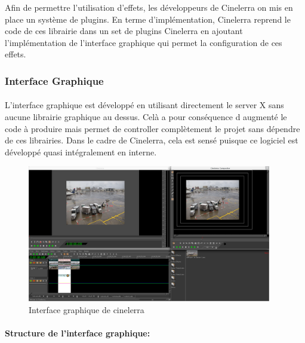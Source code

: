 Afin de permettre l'utilisation d'effets, les développeurs de Cinelerra
on mis en place un système de plugins. En terme d'implémentation,
Cinelerra reprend le code de ces librairie dans un set de plugins
Cinelerra en ajoutant l'implémentation de l'interface graphique qui
permet la configuration de ces effets.

\subsubsection{Interface Graphique}

\paragraph{}

L'interface graphique est développé en utilisant directement le server
X sans aucune librairie graphique au dessus. Celà a pour conséquence
d augmenté le code à produire mais permet de controller complètement
le projet sans dépendre de ces librairies.  Dans le cadre de Cinelerra,
cela est sensé puisque ce logiciel est développé quasi intégralement
en interne.

\begin{figure} [H]

  \begin{center}

    \includegraphics[width=0.95\textwidth]{images/cinelerra}

  \end{center}

  \caption{Interface graphique de cinelerra}

  \label{Yes}

\end{figure}

\paragraph{Structure de l'interface graphique:}


